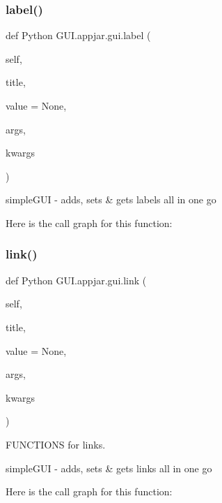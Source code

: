 \subsubsection{\texorpdfstring{label()}{label()}}
{\footnotesize\ttfamily def Python G\+U\+I.\+appjar.\+gui.\+label (\begin{DoxyParamCaption}\item[{}]{self,  }\item[{}]{title,  }\item[{}]{value = {\ttfamily None},  }\item[{}]{args,  }\item[{}]{kwargs }\end{DoxyParamCaption})}

\begin{DoxyVerb}simpleGUI - adds, sets & gets labels all in one go \end{DoxyVerb}
 Here is the call graph for this function\+:
\mbox{\label{class_python_01_g_u_i_1_1appjar_1_1gui_a0573d466339a8c064982ae5e94673835}} 
\subsubsection{\texorpdfstring{link()}{link()}}
{\footnotesize\ttfamily def Python G\+U\+I.\+appjar.\+gui.\+link (\begin{DoxyParamCaption}\item[{}]{self,  }\item[{}]{title,  }\item[{}]{value = {\ttfamily None},  }\item[{}]{args,  }\item[{}]{kwargs }\end{DoxyParamCaption})}



F\+U\+N\+C\+T\+I\+O\+NS for links. 

\begin{DoxyVerb}simpleGUI - adds, sets & gets links all in one go \end{DoxyVerb}
 Here is the call graph for this function\+:
\mbox{\label{class_python_01_g_u_i_1_1appjar_1_1gui_aa0838d82bbc76a9a358846a617924e12}} 
